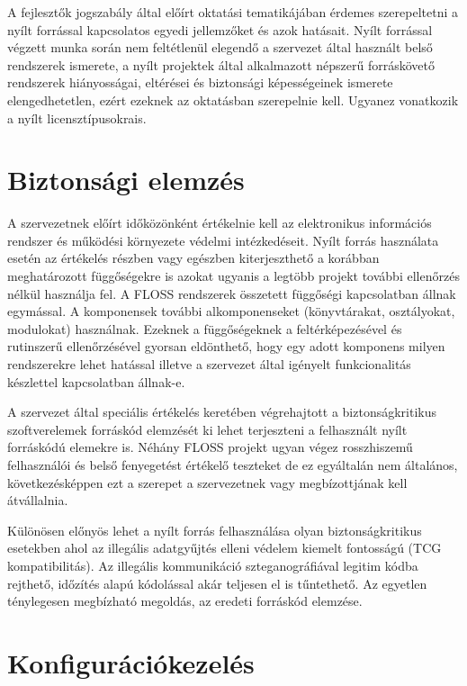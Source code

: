 \documentclass[12pt,magyar,a4paper,oneside]{scrreprt}
\begin{document}
A fejlesztők jogszabály által előírt oktatási tematikájában érdemes
szerepeltetni a nyílt forrással kapcsolatos egyedi jellemzőket és azok
hatásait. Nyílt forrással végzett munka során nem feltétlenül elegendő a
szervezet által használt belső rendszerek ismerete, a nyílt projektek
által alkalmazott népszerű forráskövető rendszerek hiányosságai,
eltérései és biztonsági képességeinek ismerete elengedhetetlen, ezért
ezeknek az oktatásban szerepelnie kell. Ugyanez vonatkozik a nyílt
licensztípusokrais.

\hypertarget{biztonsuxe1gi-elemzuxe9s}{%
\section{Biztonsági elemzés}\label{biztonsuxe1gi-elemzuxe9s}}

A szervezetnek előírt időközönként értékelnie kell az elektronikus
információs rendszer és működési környezete védelmi intézkedéseit. Nyílt
forrás használata esetén az értékelés részben vagy egészben
kiterjeszthető a korábban meghatározott függőségekre is azokat ugyanis a
legtöbb projekt további ellenőrzés nélkül használja fel. A FLOSS
rendszerek összetett függőségi kapcsolatban állnak egymással. A
komponensek további alkomponenseket (könyvtárakat, osztályokat,
modulokat) használnak. Ezeknek a függőségeknek a feltérképezésével és
rutinszerű ellenőrzésével gyorsan eldönthető, hogy egy adott komponens
milyen rendszerekre lehet hatással illetve a szervezet által igényelt
funkcionalitás készlettel kapcsolatban állnak-e.

A szervezet által speciális értékelés keretében végrehajtott a
biztonságkritikus szoftverelemek forráskód elemzését ki lehet
terjeszteni a felhasznált nyílt forráskódú elemekre is. Néhány FLOSS
projekt ugyan végez rosszhiszemű felhasználói és belső fenyegetést
értékelő teszteket de ez egyáltalán nem általános, következésképpen ezt
a szerepet a szervezetnek vagy megbízottjának kell átvállalnia.

Különösen előnyös lehet a nyílt forrás felhasználása olyan
biztonságkritikus esetekben ahol az illegális adatgyűjtés elleni védelem
kiemelt fontosságú (TCG kompatibilitás). Az illegális kommunikáció
szteganográfiával legitim kódba rejthető, időzítés alapú kódolással akár
teljesen el is tűntethető. Az egyetlen ténylegesen megbízható megoldás,
az eredeti forráskód elemzése.

\hypertarget{konfiguruxe1ciuxf3kezeluxe9s}{%
\section{Konfigurációkezelés}\label{konfiguruxe1ciuxf3kezeluxe9s}}
\end{document}
